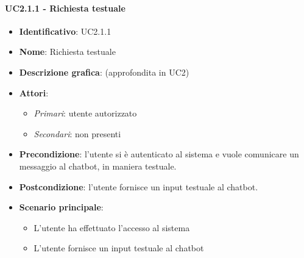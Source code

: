 \paragraph{UC2.1.1 - Richiesta testuale}
\begin{itemize}
    \item \textbf{Identificativo}: UC2.1.1
    \item \textbf{Nome}: Richiesta testuale
    \item \textbf{Descrizione grafica}: (approfondita in UC2)
    \item \textbf{Attori}:
    \begin{itemize} 
        \item \textit{Primari}: utente autorizzato
        \item \textit{Secondari}: non presenti
    \end{itemize}
        \item \textbf{Precondizione}: l'utente si è autenticato al sistema e vuole comunicare un messaggio al chatbot, in maniera testuale. 
        \item \textbf{Postcondizione}: l'utente fornisce un input testuale al chatbot. 
     \item \textbf{Scenario principale}: 
        \begin{itemize}
            \item L'utente ha effettuato l'accesso al sistema 
            \item L'utente fornisce un input testuale al chatbot 
        \end{itemize}
\end{itemize}


